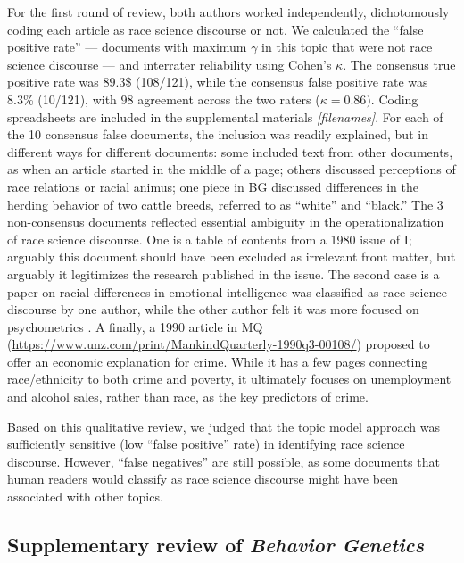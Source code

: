 \documentclass[12pt]{article}
\begin{document}
For the first round of review, both authors worked independently, dichotomously coding each article as race science discourse or not. We calculated the ``false positive rate'' --- documents with maximum \(\gamma\) in this topic that were not race science discourse --- and interrater reliability using Cohen's \(\kappa\). The consensus true positive rate was 89.3\$ (108/121), while the consensus false positive rate was 8.3\% (10/121), with \(98%
\) agreement across the two raters (\(\kappa = 0.86)\). Coding spreadsheets are included in the supplemental materials \emph{{[}filenames{]}}. For each of the 10 consensus false documents, the inclusion was readily explained, but in different ways for different documents: some included text from other documents, as when an article started in the middle of a page; others discussed perceptions of race relations or racial animus; one piece in BG discussed differences in the herding behavior of two cattle breeds, referred to as ``white'' and ``black.'' The 3 non-consensus documents reflected essential ambiguity in the operationalization of race science discourse. One is a table of contents from a 1980 issue of I; arguably this document should have been excluded as irrelevant front matter, but arguably it legitimizes the research published in the issue. The second case is a paper on racial differences in emotional intelligence was classified as race science discourse by one author, while the other author felt it was more focused on psychometrics \cite{GignacGroupDifferencesEI2010}. A finally, a 1990 article in MQ (\url{https://www.unz.com/print/MankindQuarterly-1990q3-00108/}) proposed to offer an economic explanation for crime. While it has a few pages connecting race/ethnicity to both crime and poverty, it ultimately focuses on unemployment and alcohol sales, rather than race, as the key predictors of crime.

Based on this qualitative review, we judged that the topic model approach was sufficiently sensitive (low ``false positive'' rate) in identifying race science discourse. However, ``false negatives'' are still possible, as some documents that human readers would classify as race science discourse might have been associated with other topics.

\hypertarget{bg}{%
\subsection{\texorpdfstring{Supplementary review of \emph{Behavior Genetics}}{Supplementary review of Behavior Genetics}}\label{bg}}
\end{document}
